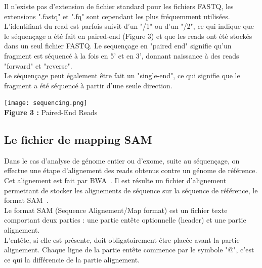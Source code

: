 \documentclass[a4paper,12pt]{article}
\begin{document}
Il n'existe pas d'extension de fichier standard pour les fichiers FASTQ, les extensions ".fastq" et ".fq" sont cependant les plus fréquemment utilisées. \\

L'identifiant du read est parfois suivit d'un "/1" ou d'un "/2", ce qui indique que le séquençage a été fait en paired-end (Figure 3) et que les reads ont été stockés dans un seul fichier FASTQ. Le sequençage en "paired end" signifie qu'un fragment est séquencé à la fois en 5' et en 3', donnant naissance à des reads "forward" et "reverse". \\
Le séquençage peut également être fait un "single-end", ce qui signifie que le fragment a été séquencé à partir d'une seule direction. 

\begin{center}
 \texttt{[image: sequencing.png]}~\\
\textbf{Figure 3 :} Paired-End Reads
\end{center}


\subsection{Le fichier de mapping SAM}

Dans le cas d'analyse de génome entier ou d'exome, suite au séquençage, on effectue une étape d'alignement des reads obtenus contre un génome de référence. Cet alignement est fait par BWA~\cite{BWA}. Il est résulte un fichier d'alignement permettant de stocker les alignements de séquence sur la séquence de référence, le format SAM~\cite{SAM}. \\

Le format SAM (Sequence Alignement/Map format) est un fichier texte comportant deux parties : une partie entête optionnelle (header) et une partie alignement.\\

L'entête, si elle est présente, doit obligatoirement être placée avant la partie alignement. Chaque ligne de la partie entête commence par le symbole "@", c'est ce qui la différencie de la partie alignement. \\
\end{document}
